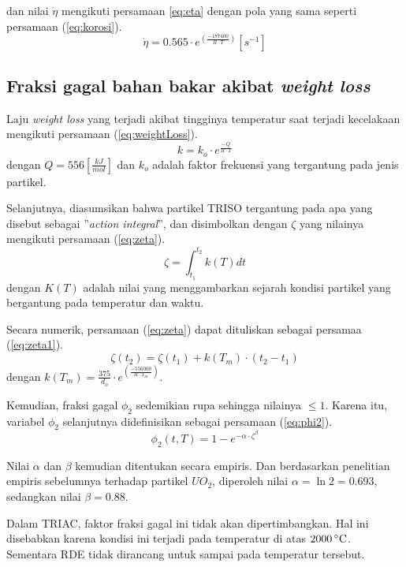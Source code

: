 \documentclass[a4paper,11pt]{report}
\begin{document}
dan nilai $\dot{\eta}$ mengikuti persamaan {\ref{eq:eta}} dengan pola yang sama seperti persamaan (\ref{eq:korosi}).
\begin{equation}
  \dot{\eta}=0.565 \cdot e^{\left(\frac{-187400}{R \cdot T}\right)} [s^{-1}]
  \label{eq:eta}
\end{equation}

\subsection{Fraksi gagal bahan bakar akibat \textit{weight loss}}
Laju \textit{weight loss} yang terjadi akibat tingginya temperatur saat terjadi kecelakaan mengikuti persamaan (\ref{eq:weightLoss}).
\begin{equation}
  k=k_o \cdot e^{\frac{-Q}{R \cdot T}}
  \label{eq:weightLoss}
\end{equation}
dengan $Q=556 \left[ \frac{kJ}{mol}\right]$ dan $k_o$ adalah faktor frekuensi yang tergantung pada jenis partikel.

Selanjutnya, diasumsikan bahwa partikel TRISO tergantung pada apa yang disebut sebagai ''\textit{action integral}'', dan disimbolkan dengan $\zeta$ yang nilainya mengikuti persamaan (\ref{eq:zeta}).
\begin{equation}
  \zeta=\int_{t_1}^{t_2} k(T) dt
  \label{eq:zeta}
\end{equation}
dengan $K(T)$ adalah nilai yang menggambarkan sejarah kondisi partikel yang bergantung pada temperatur dan waktu.

Secara numerik, persamaan (\ref{eq:zeta}) dapat dituliskan sebagai persamaa (\ref{eq:zeta1}).
\begin{equation}
  \zeta(t_2)=\zeta(t_1)+k(T_m) \cdot (t_2 - t_1)
  \label{eq:zeta1}
\end{equation}
dengan $k(T_m)=\frac{375}{d_o} \cdot e^{\left(\frac{-556000}{R \cdot T_m}\right)}$.

Kemudian, fraksi gagal $\phi_2$ sedemikian rupa sehingga nilainya $\leq 1$. Karena itu, variabel $\phi_2$ selanjutnya didefinisikan sebagai persamaan (\ref{eq:phi2}).
\begin{equation}
\phi_2(t,T)=1-e^{-\alpha \cdot \zeta^{\beta}}
\label{eq:phi2}
\end{equation}

Nilai $\alpha$ dan $\beta$ kemudian ditentukan secara empiris. Dan berdasarkan penelitian empiris sebelumnya terhadap partikel $UO_2$, diperoleh nilai $\alpha=\ln 2=0.693$, sedangkan nilai $\beta=0.88$.

Dalam TRIAC, faktor fraksi gagal ini tidak akan dipertimbangkan. Hal ini disebabkan karena kondisi ini terjadi pada temperatur di atas $2000\,^{\circ}{\rm C}$. Sementara RDE tidak dirancang untuk sampai pada temperatur tersebut.
\end{document}
